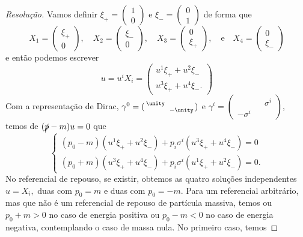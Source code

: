 \begin{proof}[Resolução]
    Vamos definir \(\xi_+ = (\begin{smallmatrix} 1\\0 \end{smallmatrix})\) e \(\xi_- = (\begin{smallmatrix}0\\1 \end{smallmatrix})\) de forma que
    \begin{equation*}
        X_1 = \begin{pmatrix}
            \xi_+\\0
        \end{pmatrix},\quad
        X_2 = \begin{pmatrix}
            \xi_-\\0
        \end{pmatrix},\quad
        X_3 = \begin{pmatrix}
            0\\\xi_+
        \end{pmatrix},\quad\text{e}\quad
        X_4 = \begin{pmatrix}
            0\\\xi_-
        \end{pmatrix}
    \end{equation*}
    e então podemos escrever
    \begin{equation*}
        u = u^i X_i = \begin{pmatrix}
            u^1 \xi_+ + u^2 \xi_-\\
            u^3 \xi_+ + u^4 \xi_-.
        \end{pmatrix}
    \end{equation*}
    Com a representação de Dirac, \(\gamma^0 = (\begin{smallmatrix} \unity &&\\ &&-\unity \end{smallmatrix})\) e \(\gamma^i = (\begin{smallmatrix} && \sigma^i\\ -\sigma^i && \end{smallmatrix})\), temos de \((\slashed{p} - m)u = 0\) que
    \begin{equation*}
        \begin{cases}
            (p_0 - m) (u^1 \xi_+ + u^2 \xi_-) + p_i \sigma^i (u^3 \xi_+ + u^4 \xi_-) = 0\\
            (p_0 + m) (u^3 \xi_+ + u^4 \xi_-) + p_i \sigma^i (u^1 \xi_+ + u^2 \xi_-) = 0.
        \end{cases}
    \end{equation*}
    No referencial de repouso, se existir, obtemos as quatro soluções independentes \(u = X_i,\) duas com \(p_0 = m\) e duas com \(p_0 = -m.\) Para um referencial arbitrário, mas que não é um referencial de repouso de partícula massiva, temos ou \(p_0 + m > 0\) no caso de energia positiva ou \(p_0 - m < 0\) no caso de energia negativa, contemplando o caso de massa nula. No primeiro caso, temos


\end{proof}
